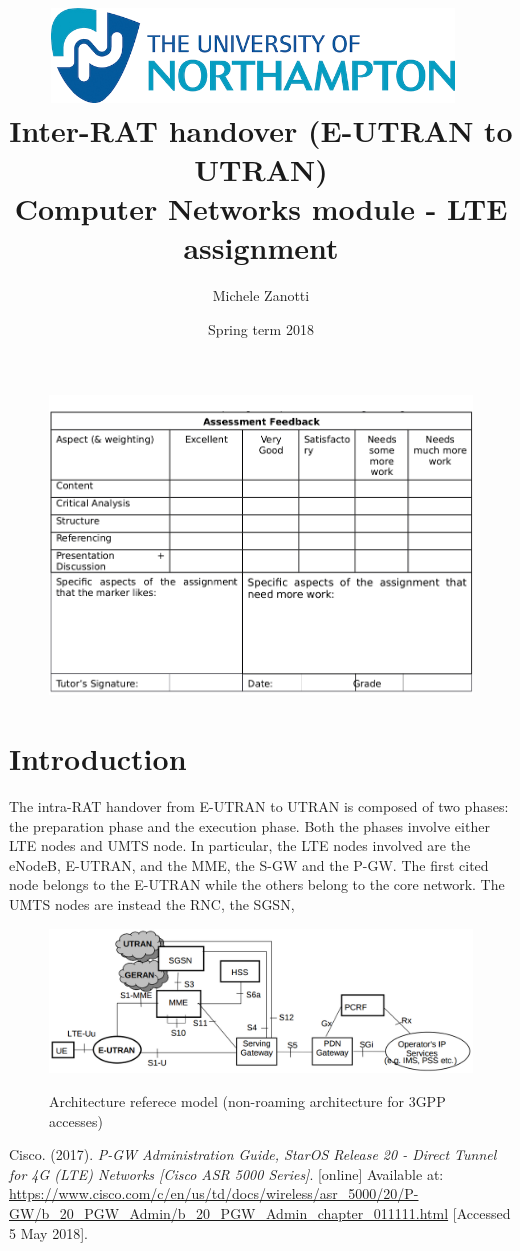 \documentclass[12pt, a4paper]{article}
\title{
  \includegraphics[width=0.8\textwidth]{img/logo.png}~ \\
  Inter-RAT handover (E-UTRAN to UTRAN) \\ \large Computer Networks module - LTE assignment
}
\author{Michele Zanotti}
\date{Spring term 2018}
\begin{document}
\maketitle
\begin{figure}[htb]
	\centering
	\includegraphics[width=1\linewidth]{img/valuation-table.png}
\end{figure}

\newpage

\section{Introduction}
The intra-RAT handover from E-UTRAN to UTRAN is composed of two phases: the
preparation phase and the execution phase. Both the phases involve either LTE
nodes and UMTS node. In particular, the LTE nodes involved are the eNodeB,
E-UTRAN, and the MME, the S-GW and the P-GW. The first cited node belongs to
the E-UTRAN while the others belong to the core network. The UMTS nodes are instead
the RNC, the SGSN,

\begin{figure}[htb]
	\centering
	\includegraphics[width=1\linewidth]{img/architecture-reference.png}
	\label{fig:architecture-model}
	\caption{Architecture referece model (non-roaming architecture for 3GPP accesses)}
\end{figure}






\begin{thebibliography}{99}
\footnotesize

  Cisco. (2017).
  \textit{P-GW Administration Guide, StarOS Release 20 - Direct Tunnel for 4G (LTE) Networks [Cisco ASR 5000 Series]}. [online]
  Available at: \url{https://www.cisco.com/c/en/us/td/docs/wireless/asr_5000/20/P-GW/b_20_PGW_Admin/b_20_PGW_Admin_chapter_011111.html}
  [Accessed 5 May 2018].
\end{thebibliography}
\end{document}
